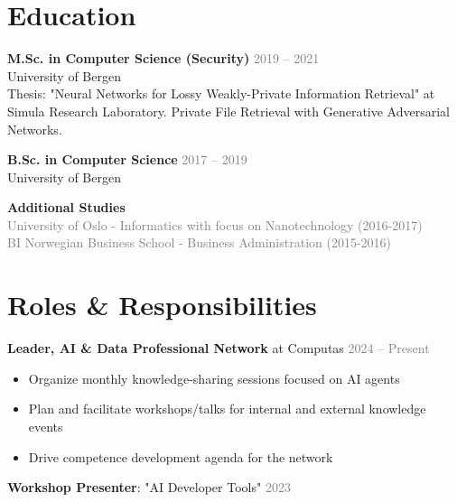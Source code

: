 \documentclass[11pt,a4paper]{article}
\begin{document}
\vspace{10pt}

\clearpage
\section{Education}

\textbf{M.Sc. in Computer Science (Security)} \hfill \textcolor{gray}{2019 – 2021}\\
University of Bergen\\
Thesis: "Neural Networks for
Lossy Weakly-Private Information Retrieval" at Simula Research Laboratory. Private File Retrieval with Generative Adversarial Networks.

\vspace{10pt}

\textbf{B.Sc. in Computer Science} \hfill \textcolor{gray}{2017 – 2019}\\
University of Bergen

\vspace{10pt}

\textbf{Additional Studies}\\
\textcolor{gray}{University of Oslo - Informatics with focus on Nanotechnology (2016-2017)}\\
\textcolor{gray}{BI Norwegian Business School - Business Administration (2015-2016)}

\vspace{10pt}

\section{Roles \& Responsibilities}

\textbf{Leader, AI \& Data Professional Network} at Computas \hfill \textcolor{gray}{2024 – Present}
\begin{itemize}[itemsep=0.3em, leftmargin=*]
\item Organize monthly knowledge-sharing sessions focused on AI agents
\item Plan and facilitate workshops/talks for internal and external knowledge events
\item Drive competence development agenda for the network
\end{itemize}

\textbf{Workshop Presenter}: "AI Developer Tools" \hfill \textcolor{gray}{2023}

\vspace{10pt}
\end{document}
